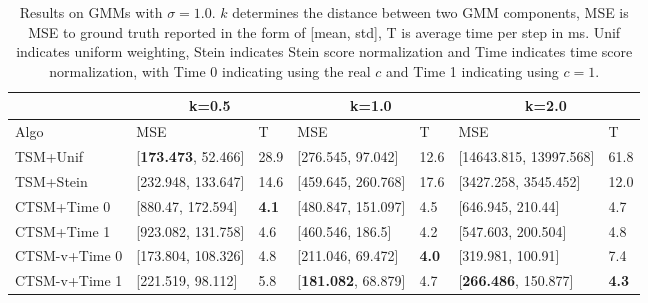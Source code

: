 \begin{table*}
        \begin{center}
        \caption{Results on GMMs with $\sigma=1.0$. $k$ determines the distance between two GMM components, MSE is MSE to ground truth reported in the form of [mean, std], T is average time per step in ms. Unif indicates uniform weighting, Stein indicates Stein score normalization and Time indicates time score normalization, with Time 0 indicating using the real $c$ and Time 1 indicating using $c=1$.}
                \begin{tabular}{|l|l|l|l|l|l|l|}
                        \hline
                        & \multicolumn{2}{|c|}{k=0.5} & \multicolumn{2}{|c|}{k=1.0} & \multicolumn{2}{|c|}{k=2.0} \\
                        \hline
                        Algo & MSE & T & MSE & T & MSE & T \\
                        \hline
                        TSM+Unif & [\textbf{173.473}, 52.466] & 28.9 & [276.545, 97.042] & 12.6 & [14643.815, 13997.568] & 61.8 \\
                        \hline
                        TSM+Stein & [232.948, 133.647] & 14.6 & [459.645, 260.768] & 17.6 & [3427.258, 3545.452] & 12.0 \\
                        \hline
                        CTSM+Time 0 & [880.47, 172.594] & \textbf{4.1} & [480.847, 151.097] & 4.5 & [646.945, 210.44] & 4.7 \\
                        \hline
                        CTSM+Time 1 & [923.082, 131.758] & 4.6 & [460.546, 186.5] & 4.2 & [547.603, 200.504] & 4.8 \\
                        \hline
                        CTSM-v+Time 0 & [173.804, 108.326] & 4.8 & [211.046, 69.472] & \textbf{4.0} & [319.981, 100.91] & 7.4 \\
                        \hline
                        CTSM-v+Time 1 & [221.519, 98.112] & 5.8 & [\textbf{181.082}, 68.879] & 4.7 & [\textbf{266.486}, 150.877] & \textbf{4.3} \\
                        \hline
                \end{tabular}
        \label{tbl:gmms}
        \end{center}
\end{table*}

